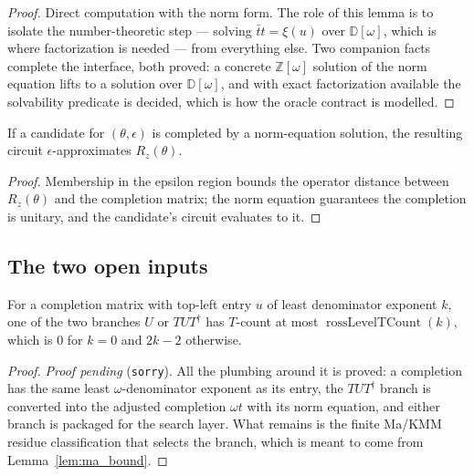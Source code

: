 \begin{proof}
  \leanok
  Direct computation with the norm form.  The role of this lemma is to isolate
  the number-theoretic step --- solving $\bar t t = \xi(u)$ over
  $\mathbb{D}[\omega]$, which is where factorization is needed --- from
  everything else.  Two companion facts complete the interface, both proved: a
  concrete $\mathbb{Z}[\omega]$ solution of the norm equation lifts to a
  solution over $\mathbb{D}[\omega]$, and with exact factorization available the
  solvability predicate is decided, which is how the oracle contract is
  modelled.
\end{proof}

\begin{lemma}
  \label{lem:completed_approx}
  \leanok
  If a candidate for $(\theta,\epsilon)$ is completed by a norm-equation
  solution, the resulting circuit $\epsilon$-approximates $R_z(\theta)$.
\end{lemma}

\begin{proof}
  \leanok
  Membership in the epsilon region bounds the operator distance between
  $R_z(\theta)$ and the completion matrix; the norm equation guarantees the
  completion is unitary, and the candidate's circuit evaluates to it.
\end{proof}

\subsection{The two open inputs}

\begin{lemma}
  \label{lem:selinger75}
  \leanok
  For a completion matrix with top-left entry $u$ of least denominator exponent
  $k$, one of the two branches $U$ or $TUT^\dagger$ has $T$-count at most
  $\operatorname{rossLevelTCount}(k)$, which is $0$ for $k = 0$ and $2k-2$
  otherwise.
\end{lemma}

\begin{proof}
  \emph{Proof pending} (\texttt{sorry}).  All the plumbing around it is proved:
  a completion has the same least $\omega$-denominator exponent as its entry,
  the $TUT^\dagger$ branch is converted into the adjusted completion
  $\omega t$ with its norm equation, and either branch is packaged for the
  search layer.  What remains is the finite Ma/KMM residue classification that
  selects the branch, which is meant to come from
  Lemma~\ref{lem:ma_bound}.
\end{proof}

